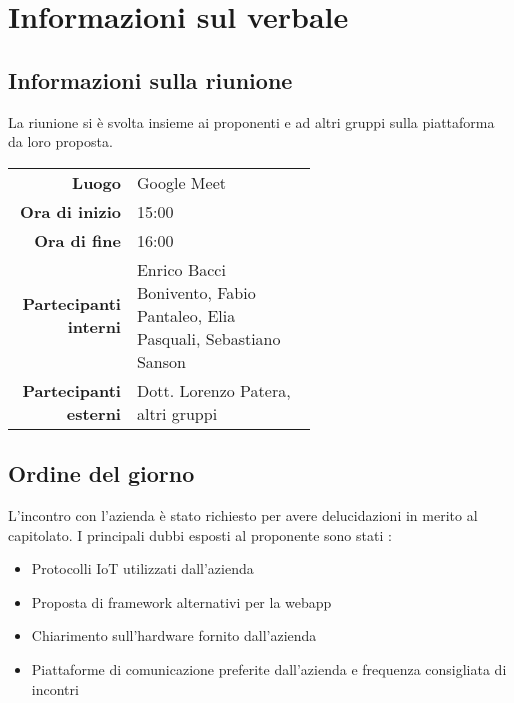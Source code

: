\section{Informazioni sul verbale}

\subsection{Informazioni sulla riunione}
La riunione si è svolta insieme ai proponenti e ad altri gruppi sulla piattaforma da loro proposta.

\begin{center}
	\begin{tabular}{r|p{0.6\linewidth}}
		\toprule
		\textbf{Luogo} & Google Meet \\
		\textbf{Ora di inizio} & 15:00 \\
		\textbf{Ora di fine} & 16:00 \\
		\textbf{Partecipanti interni} & Enrico Bacci Bonivento, Fabio Pantaleo, Elia Pasquali, Sebastiano Sanson \\
		\textbf{Partecipanti esterni} & Dott. Lorenzo Patera, altri gruppi
	\end{tabular}
\end{center}

\medskip

\subsection{Ordine del giorno}
L'incontro con l'azienda è stato richiesto per avere delucidazioni in merito al capitolato. I principali dubbi esposti al proponente sono stati :
\begin{itemize}
	\item Protocolli IoT utilizzati dall'azienda
	\item Proposta di framework alternativi per la webapp
	\item Chiarimento sull'hardware fornito dall'azienda
	\item Piattaforme di comunicazione preferite dall'azienda e frequenza
	consigliata di incontri
\end{itemize}
